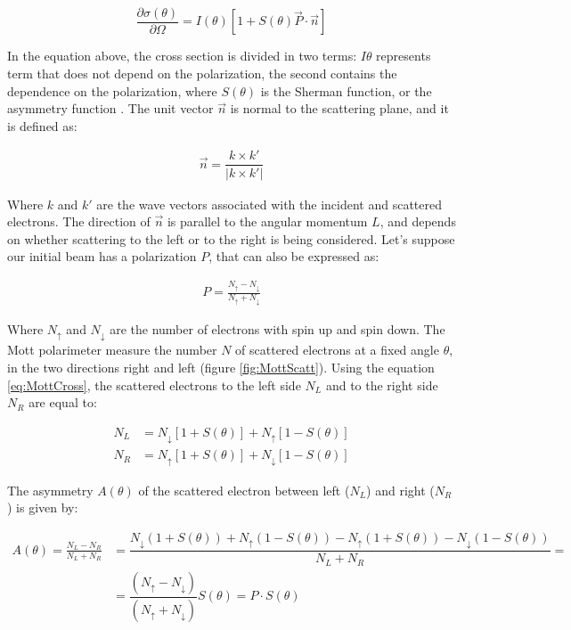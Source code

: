 \begin{equation} \label{eq:MottCross}
\dfrac{\partial\sigma(\theta)}{\partial \Omega} = I(\theta) [1 + S(\theta) \vec{P} \cdot \vec{n} ]
\end{equation}

In the equation above, the cross section is divided in two terms: $I{\theta}$ represents term that does not depend on the polarization, the second contains the dependence on the polarization, where $S(\theta)$ is the Sherman function, or the asymmetry function \cite{10.1063/1.1143371}. The unit vector $\vec{n}$ is normal to the scattering plane, and it is defined as:

\begin{align*}
\vec{n} = \dfrac{k \times k'}{|k \times k'|}
\end{align*}

Where $k$ and $k'$ are the wave vectors associated with the incident and scattered electrons. The direction of $\vec{n}$ is parallel to the angular momentum $L$, and depends on whether scattering to the left or to the right is being considered.
Let's suppose our initial beam has a polarization $P$, that can also be expressed as:

\begin{align*}
P = \frac{N_{\uparrow} - N_{\downarrow}}{N_{\uparrow} + N_{\downarrow}}
\end{align*}

Where $N_{\uparrow}$ and $N_{\downarrow}$ are the number of electrons with spin up and spin down. The Mott polarimeter measure the number $N$ of scattered electrons at a fixed angle $\theta$, in the two directions right and left (figure \ref{fig:MottScatt}). Using the equation \ref{eq:MottCross}, the scattered electrons to the left side $N_{L}$ and to the right side $N_{R}$ are equal to: 

\begin{align*}
N_{L} &= N_{\downarrow}[1 + S(\theta)] + N_{\uparrow}[1 - S(\theta)] \\
N_{R} &= N_{\uparrow}[1 + S(\theta)] + N_{\downarrow}[1 - S(\theta)]
\end{align*}

The asymmetry $A(\theta)$ of the scattered electron between left ($N_{L}$) and right ($N_{R}$) is given by:

\begin{align*}
A(\theta) = \frac{N_{L} - N_{R}}{N_{L} + N_{R}} &= \dfrac{N_{\downarrow}(1 + S(\theta)) + N_{\uparrow}(1 - S(\theta)) - N_{\uparrow}(1 + S(\theta)) - N_{\downarrow}(1 - S(\theta))}{N_{L} + N_{R}} = \\ 
&= \dfrac{(N_{\uparrow} - N_{\downarrow})}{(N_{\uparrow} + N_{\downarrow})}S(\theta) =  P \cdot S(\theta)
\end{align*}


